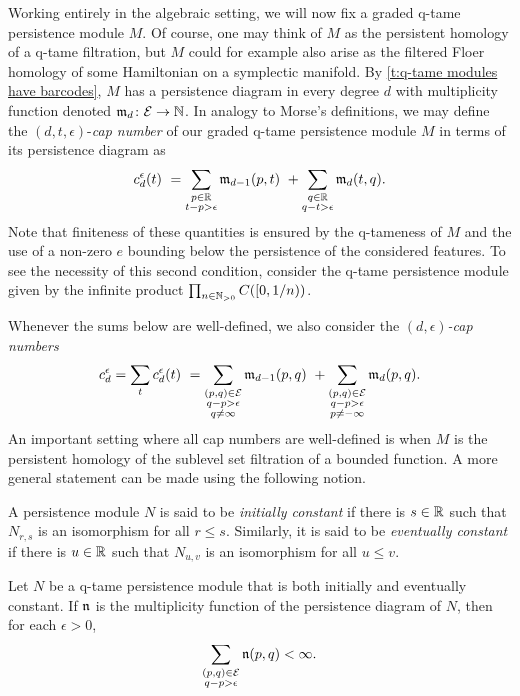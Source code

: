 Working entirely in the algebraic setting, we will now fix a graded q-tame persistence module $M$.
Of course, one may think of $M$ as the persistent homology of a q-tame filtration, but $M$ could for example also arise as the filtered Floer homology of some Hamiltonian on a symplectic manifold.
By \cref{t:q-tame modules have barcodes}, $M$ has a persistence diagram in every degree $d$ with multiplicity function denoted $\mathfrak{m}_d \colon \mathcal{E} \to \mathbb{N}$.
In analogy to Morse's definitions, we may define the $(d, t, \epsilon)$-\emph{cap number} of our graded q-tame persistence module $M$ in terms of its persistence diagram as
\begin{equation*}
c_{d}^{\epsilon}(t) \ =
\sum_{\substack{p \in \mathbb{R} \\ t - p > \epsilon}} \mathfrak{m}_{d-1}(p, t) \ +
\sum_{\substack{q \in \mathbb{R} \\ q - t > \epsilon}} \mathfrak{m}_d(t, q).
\end{equation*}
Note that finiteness of these quantities is ensured by the q-tameness of $M$ and the use of a non-zero $e$ bounding below the persistence of the considered features.
To see the necessity of this second condition, consider the q-tame persistence module given by the infinite product $\prod_{n \in \mathbb{N}_{> 0}} C([0,1/n))$.

Whenever the sums below are well-defined, we also consider the \emph{$(d,\epsilon)$-cap numbers} 
\[
c_{d}^{\epsilon} =
\sum_{t} c_{d}^{\epsilon}(t) \ =
\sum_{\substack{(p,q) \in \mathcal{E} \\ q - p > \epsilon \\ q \neq \infty}} \mathfrak{m}_{d-1}(p,q) \ +
\sum_{\substack{(p,q) \in \mathcal{E} \\ q - p > \epsilon \\ p \neq -\infty}}\mathfrak{m}_d(p,q).
\]
An important setting where all cap numbers are well-defined is when $M$ is the persistent homology of the sublevel set filtration of a bounded function.
A more general statement can be made using the following notion.

\begin{defi} \label{d:initially and eventually constant}
	A persistence module $N$ is said to be \emph{initially constant} if there is $s \in \mathbb{R}$ such that $N_{r,s}$ is an isomorphism for all $r \leq s$.
	Similarly, it is said to be \emph{eventually constant} if there is $u \in \mathbb{R}$
	such that $N_{u,v}$ is an isomorphism for all $u \leq v$.
\end{defi}

\begin{thm} \label{t:cap numbers well defined}
	Let $N$ be a q-tame persistence module that is both initially and eventually constant.
	If $\mathfrak{n}$ is the multiplicity function of the persistence diagram of $N$,
	then for each $\epsilon > 0$,
	\begin{equation*}
	\sum_{ \substack{ (p,q) \in \mathcal{E} \\ q-p > \epsilon } } \mathfrak{n} (p,q) < \infty.
	\end{equation*}
\end{thm}

